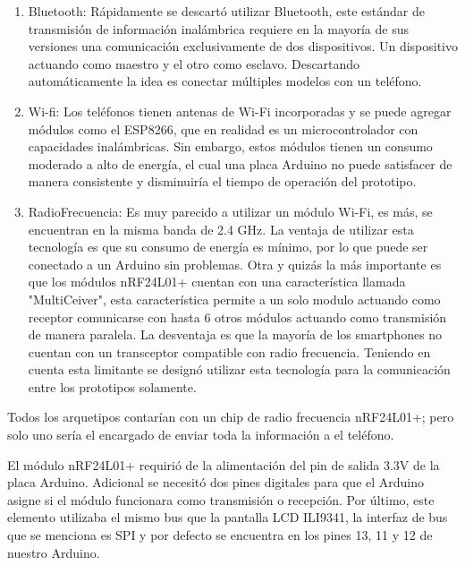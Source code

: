 \begin{enumerate}
	\item Bluetooth: Rápidamente se descartó utilizar Bluetooth, este estándar de transmisión de información inalámbrica requiere en la mayoría de sus versiones una comunicación exclusivamente de dos dispositivos. Un dispositivo actuando como maestro y el otro como esclavo. Descartando automáticamente la idea es conectar múltiples modelos con un teléfono. 
	
	\item Wi-fi: Los teléfonos tienen antenas de Wi-Fi incorporadas y se puede agregar módulos como el ESP8266, que en realidad es un microcontrolador con capacidades inalámbricas. Sin embargo, estos módulos tienen un consumo moderado a alto de energía, el cual una placa Arduino no puede satisfacer de manera consistente y disminuiría el tiempo de operación del prototipo.
	
	
	\item RadioFrecuencia: Es muy parecido a utilizar un módulo Wi-Fi, es más, se encuentran en la misma banda de 2.4 GHz. La ventaja de utilizar esta tecnología es que su consumo de energía es mínimo, por lo que puede ser conectado a un Arduino sin problemas. Otra y quizás la más importante es que los módulos nRF24L01+ cuentan con una característica llamada "MultiCeiver", esta característica permite a un solo modulo actuando como receptor comunicarse con hasta 6 otros módulos actuando como transmisión de manera paralela.  La desventaja es que la mayoría de los smartphones no cuentan con un transceptor compatible con radio frecuencia. Teniendo en cuenta esta limitante se designó utilizar esta tecnología para la comunicación entre los prototipos solamente. 
\end{enumerate} 

\par \noindent
Todos los arquetipos contarían con un chip de radio frecuencia nRF24L01+; pero solo uno sería el encargado de enviar toda la información a el teléfono. 

\par \noindent
El módulo nRF24L01+ requirió de la alimentación del pin de salida 3.3V de la placa Arduino. Adicional se necesitó dos pines digitales para que el Arduino asigne si el módulo funcionara como transmisión o recepción. Por último, este elemento utilizaba el mismo bus que la pantalla LCD ILI9341, la interfaz de bus que se menciona es SPI y por defecto se encuentra en los pines 13, 11 y 12 de nuestro Arduino. 

